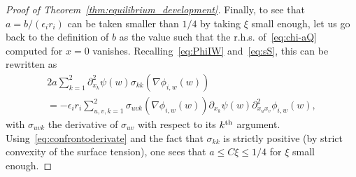 \documentclass[AHL,Unicode,longabstracts,published]{cedram}
\begin{document}
\begin{proof}[Proof of Theorem~\ref{thm:equilibrium_development}]
Finally, to see that $a=b/(\epsilon_i r_i)$ can be taken smaller than $1/4$ by taking $\xi$ small enough, let us go back to the definition of $b$ as the value such that the r.h.s. of~\eqref{eq:chi-aQ} computed for $x=0$ vanishes. Recalling~\eqref{eq:PhiIW} and~\eqref{eq:sS}, this can be rewritten as
\begin{multline}\label{eq:ato0}
2a \sum_{k=1}^2 \partial^2_{x_k}\psi(w)\sigma_{kk}(\nabla \phi_{i,w}(w))\\= -\epsilon_i r_i \sum_{u,v,k=1}^2 \sigma_{uvk}(\nabla\phi_{i,w}(w))\partial_{x_k}\psi(w)\partial^2_{x_u x_v}\phi_{i,w}(w),
\end{multline}
with $\sigma_{uvk}$ the derivative of $\sigma_{uv}$ with respect to its $k^{\rm th}$ argument. Using~\eqref{eq:confrontoderivate} and the fact that $\sigma_{kk}$ is strictly positive (by strict convexity of the surface tension), one sees that $a\le C\xi\le 1/4$ for $\xi$ small enough.
\end{proof}

\vspace*{15pt}



\end{document}
